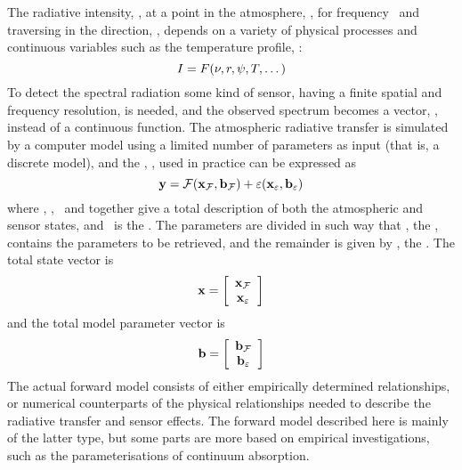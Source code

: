  The radiative intensity, \Mpi, at a point in the atmosphere, \Rds, for
 frequency \Frq\ and traversing in the direction, \ZntAng, depends
 on a variety of physical processes and continuous variables such as
 the temperature profile, \Tmp:
 \begin{equation}
   I = F(\nu,r,\psi,T,\dots)
 \end{equation} 
 To detect the spectral radiation some kind of sensor, having a finite
 spatial and frequency resolution, is needed, and the observed
 spectrum becomes a vector, \MsrVct, instead of a continuous function.
 The atmospheric radiative transfer is simulated by a computer model
 using a limited number of parameters as input (that is, a discrete
 model), and the , \FrwMdl, used in practice can
 be expressed as
 \begin{equation}
   \mathbf{y} = \mathcal{F}(\mathbf{x}_{\mathcal{F}},\mathbf{b}_{\mathcal{F}}) + 
                      \varepsilon(\mathbf{x}_{\varepsilon},\mathbf{b}_{\varepsilon})
  \label{eq:formalism:fm}
 \end{equation}
 where \aSttVct{\FrwMdl}, \aFrwMdlVct{\FrwMdl}, \aSttVct{\MsrErrVct}\ 
 and \aFrwMdlVct{\MsrErrVct} together give a total description of both
 the atmospheric and sensor states, and \MsrErrVct\ is the
 . The parameters are divided in such way
 that \SttVct, the \textindex{state vector}, contains the parameters to
 be retrieved, and the remainder is given by \FrwMdlVct, the
 . The total state vector is
 \begin{equation}
   \mathbf{x} = \left[ \begin{array}{c} \mathbf{x}_{\mathcal{F}} \\ 
                                     \mathbf{x}_{\varepsilon} \end{array} \right]
 \end{equation}
 and the total model parameter vector is
 \begin{equation}
   \mathbf{b} = \left[ \begin{array}{c} \mathbf{b}_{\mathcal{F}} \\ 
                                    \mathbf{b}_{\varepsilon} \end{array} \right]
 \end{equation}
 The actual forward model consists of either empirically determined
 relationships, or numerical counterparts of the physical
 relationships needed to describe the radiative transfer and sensor
 effects. The forward model described here is mainly of the latter
 type, but some parts are more based on empirical investigations, such
 as the parameterisations of continuum absorption. 
  
